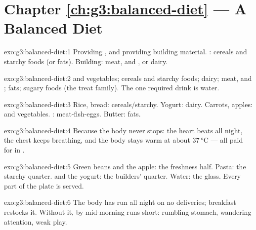 \section*{Chapter \ref{ch:g3:balanced-diet} --- A Balanced Diet}

\begin{solution}{exo:g3:balanced-diet:1}
Providing , and providing building material. :
cereals and starchy foods (or fats). Building: meat,  and
, or dairy.
\end{solution}

\begin{solution}{exo:g3:balanced-diet:2}
 and vegetables; cereals and starchy foods; dairy; meat,
 and ; fats; sugary foods (the treat family). The one
required drink is water.
\end{solution}

\begin{solution}{exo:g3:balanced-diet:3}
Rice, bread: cereals/starchy. Yogurt: dairy. Carrots, apples:
 and vegetables. : meat-fish-eggs. Butter: fats.
\end{solution}

\begin{solution}{exo:g3:balanced-diet:4}
Because the body never stops: the heart beats all night, the
chest keeps breathing, and the body stays warm at about
$\qty{37}{\degreeCelsius}$ --- all paid for in .
\end{solution}

\begin{solution}{exo:g3:balanced-diet:5}
Green beans and the apple: the freshness half. Pasta: the
starchy quarter.  and the yogurt: the builders' quarter.
Water: the glass. Every part of the plate is served.
\end{solution}

\begin{solution}{exo:g3:balanced-diet:6}
The body has run all night on no deliveries; breakfast restocks
it. Without it, by mid-morning  runs short: rumbling
stomach, wandering attention, weak play.
\end{solution}

